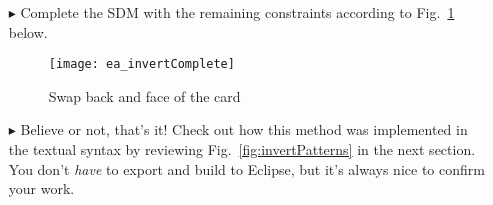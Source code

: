 \begin{itemize}
\item[$\blacktriangleright$] Complete the SDM with the remaining constraints according to Fig.~\ref{fig:sdm_invertComplete} below.

\vspace{0.5cm}

\begin{figure}[htbp]
\begin{center}
  \texttt{[image: ea\_invertComplete]}
  \caption{Swap back and face of the card}  
  \label{fig:sdm_invertComplete}
\end{center}
\end{figure}

\vspace{0.5cm}

\item[$\blacktriangleright$] Believe or not, that's it! Check out how this method was implemented in the textual syntax by reviewing
Fig.~\ref{fig:invertPatterns} in the next section. You don't \emph{have} to export and build to Eclipse, but it's always nice to confirm your work.


\end{itemize}
